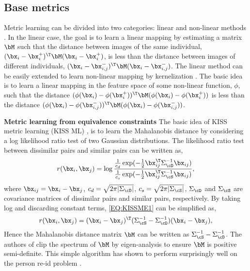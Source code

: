 \documentclass[10pt,twocolumn,letterpaper]{article}
\def\bxi{{\bx_i}}
\def\bxj{{\bx_j}}
\def\bxip{{\bx_i^{+}}}
\def\bxijm{{\bx_{i,j}^{-}}}
\renewcommand{\paragraph}{\textbf}
\begin{document}
\subsection{Base metrics}
\label{sec:metric}
%
%
%
%
%
%
%
%
%
%
%
Metric learning can be divided into two categories:
linear \cite{Davis2007Information,Kostinger2012Large,Weinberger2006Distance}
and non-linear methods \cite{Chopra2005Learning,Frome2007Learning,
Kedem2012Nonlinear,Weinberger2008Fast,Xiong2014Person}.
In the linear case, the goal is to learn a linear mapping
by estimating a matrix $\bM$
such that the distance between images of the same individual,
$(\bxi - \bxip)^\T \bM (\bxi - \bxip)$, is less than
the distance between images of different individuals,
$(\bxi - \bxijm)^\T \bM (\bxi - \bxijm)$.
The linear method can be easily extended to learn non-linear
mapping by kernelization \cite{Shawe2004Kernel}.
The basic idea is to learn a linear mapping in the feature space of some
non-linear function, $\phi$,
such that
the distance
$( \phi(\bxi) - \phi(\bxip) )^\T \bM ( \phi(\bxi) - \phi(\bxip) )$
is less than
the distance
$( \phi(\bxi) - \phi(\bxijm) )^\T \bM ( \phi(\bxi) - \phi(\bxijm) )$.
%
%
%
%


\paragraph{Metric learning from equivalence constraints}
The basic idea of KISS metric learning
(KISS ML) \cite{Kostinger2012Large}, is to
learn the Mahalanobis distance by considering a log likelihood ratio
test of two Gaussian distributions.
The likelihood ratio test between dissimilar pairs and similar pairs
can be written as,
%
%
\begin{align}
    \label{EQ:KISSME1}
    r(\bxi,\bxj) = \log \frac{ \frac{1}{c_d} \exp(-\frac{1}{2} \bx_{ij}^\T \Sigma_{\cD}^{-1} \bx_{ij}  )}
                             { \frac{1}{c_s} \exp(-\frac{1}{2} \bx_{ij}^\T \Sigma_{\cS}^{-1} \bx_{ij}  )} ,
\end{align}
%
%
where $\bx_{ij} = \bx_{i} - \bx_{j}$,
$c_d = \sqrt{2 \pi | \Sigma_{\cD} |} $,
$c_s = \sqrt{2 \pi | \Sigma_{\cS} |} $,
$\Sigma_{\cD}$ and $\Sigma_{\cS}$ are covariance matrices of
dissimilar pairs and similar pairs, respectively.
By taking log and discarding constant terms,
\eqref{EQ:KISSME1} can be simplified as,
%
\begin{align}
    \label{EQ:KISSME2}
    r(\bxi,\bxj) = (\bx_{i} - \bx_{j})^\T (\Sigma_{\cS}^{-1} - \Sigma_{\cD}^{-1})
                      (\bx_{i} - \bx_{j}),
\end{align}
%
Hence the Mahalanobis distance matrix $\bM$ can be written as
$\Sigma_{\cS}^{-1} - \Sigma_{\cD}^{-1}$.
The authors of \cite{Kostinger2012Large} clip the spectrum of $\bM$ by eigen-analysis
to ensure $\bM$ is positive semi-definite.
This simple algorithm has shown to perform surprisingly well on
the person re-id problem
\cite{Roth2014Mahalanobis, Li2014Deep}.
\end{document}
